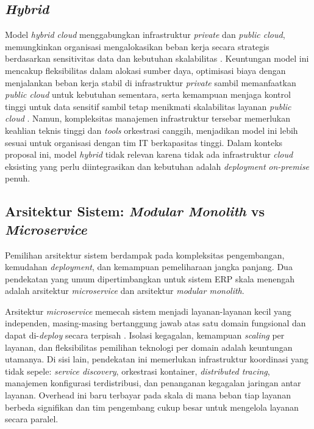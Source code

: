 \subsection{\textit{Hybrid}}

Model \textit{hybrid cloud} menggabungkan infrastruktur \textit{private} dan \textit{public cloud}, memungkinkan organisasi mengalokasikan beban kerja secara strategis berdasarkan sensitivitas data dan kebutuhan skalabilitas \cite{odunayo2018cloud}. Keuntungan model ini mencakup fleksibilitas dalam alokasi sumber daya, optimisasi biaya dengan menjalankan beban kerja stabil di infrastruktur \textit{private} sambil memanfaatkan \textit{public cloud} untuk kebutuhan sementara, serta kemampuan menjaga kontrol tinggi untuk data sensitif sambil tetap menikmati skalabilitas layanan \textit{public cloud} \cite{Younus2024}. Namun, kompleksitas manajemen infrastruktur tersebar memerlukan keahlian teknis tinggi dan \textit{tools} orkestrasi canggih, menjadikan model ini lebih sesuai untuk organisasi dengan tim IT berkapasitas tinggi. Dalam konteks proposal ini, model \textit{hybrid} tidak relevan karena tidak ada infrastruktur \textit{cloud} eksisting yang perlu diintegrasikan dan kebutuhan adalah \textit{deployment} \textit{on-premise} penuh.

\subsection{Arsitektur Sistem: \textit{Modular Monolith} vs \textit{Microservice}}

Pemilihan arsitektur sistem berdampak pada kompleksitas pengembangan, kemudahan \textit{deployment}, dan kemampuan pemeliharaan jangka panjang. Dua pendekatan yang umum dipertimbangkan untuk sistem ERP skala menengah adalah arsitektur \textit{microservice} dan arsitektur \textit{modular monolith}.

Arsitektur \textit{microservice} memecah sistem menjadi layanan-layanan kecil yang independen, masing-masing bertanggung jawab atas satu domain fungsional dan dapat di-\textit{deploy} secara terpisah \cite{fowler2014microservices}. Isolasi kegagalan, kemampuan \textit{scaling} per layanan, dan fleksibilitas pemilihan teknologi per domain adalah keuntungan utamanya. Di sisi lain, pendekatan ini memerlukan infrastruktur koordinasi yang tidak sepele: \textit{service discovery}, orkestrasi kontainer, \textit{distributed tracing}, manajemen konfigurasi terdistribusi, dan penanganan kegagalan jaringan antar layanan. Overhead ini baru terbayar pada skala di mana beban tiap layanan berbeda signifikan dan tim pengembang cukup besar untuk mengelola layanan secara paralel.

